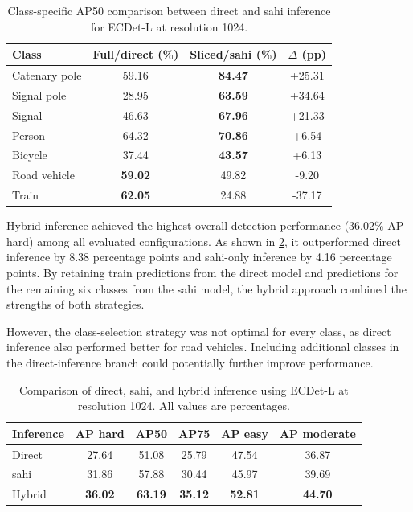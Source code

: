 \begin{table}[t]
    \centering
            \caption{Class-specific AP50 comparison between direct and \acrshort{sahi} inference for ECDet-L at resolution 1024.}
    \label{tab:class_specific_sahi}

    \begin{tabular}{lccc}
        \hline
        \textbf{Class} &\textbf{Full/direct (\%)} & \textbf{Sliced/\acrshort{sahi} (\%)} & \textbf{$\Delta$ (pp)} \\
        \hline
        Catenary pole & 59.16 & \textbf{84.47} & +25.31 \\
        Signal pole   & 28.95 & \textbf{63.59} & +34.64 \\
        Signal        & 46.63 & \textbf{67.96} & +21.33 \\
        Person        & 64.32 & \textbf{70.86} & +6.54 \\
        Bicycle       & 37.44 & \textbf{43.57} & +6.13 \\
        Road vehicle  & \textbf{59.02} & 49.82 & -9.20 \\
        Train         & \textbf{62.05} & 24.88 & -37.17 \\
        \hline
    \end{tabular}

\end{table}

Hybrid inference achieved the highest overall detection performance (36.02\% AP hard) among all evaluated configurations. As shown in \cref{tab:hybrid_comparison}, it outperformed direct inference by 8.38 percentage points and \acrshort{sahi}-only inference by 4.16 percentage points. By retaining train predictions from the direct model and predictions for the remaining six classes from the \acrshort{sahi} model, the hybrid approach combined the strengths of both strategies.


However, the class-selection strategy was not optimal for every class, as direct inference also performed better for road vehicles. Including additional classes in the direct-inference branch could potentially further improve performance.

\begin{table}[t]
    \centering
            \caption{Comparison of direct, \acrshort{sahi}, and hybrid inference
    using ECDet-L at resolution 1024. All values are percentages.}
    \label{tab:hybrid_comparison}

    \begin{tabular}{lccccc}
        \hline
        \textbf{Inference} &
        \textbf{AP hard} &
        \textbf{AP50} &
        \textbf{AP75} &
        \textbf{AP easy} &
        \textbf{AP moderate} \\
        \hline
        Direct & 27.64 & 51.08 & 25.79 & 47.54 & 36.87 \\
        \acrshort{sahi}   & 31.86 & 57.88 & 30.44 & 45.97 & 39.69 \\
        Hybrid & \textbf{36.02} & \textbf{63.19} &
                 \textbf{35.12} & \textbf{52.81} & \textbf{44.70} \\
        \hline
    \end{tabular}

\end{table}

